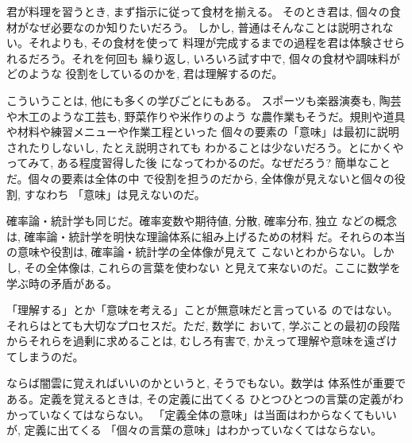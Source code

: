 君が料理を習うとき, まず指示に従って食材を揃える。
そのとき君は, 個々の食材がなぜ必要なのか知りたいだろう。
しかし, 普通はそんなことは説明されない。それよりも, その食材を使って
料理が完成するまでの過程を君は体験させられるだろう。それを何回も
繰り返し, いろいろ試す中で, 個々の食材や調味料がどのような
役割をしているのかを, 君は理解するのだ。\mv

こういうことは, 他にも多くの学びごとにもある。
スポーツも楽器演奏も, 陶芸や木工のような工芸も, 野菜作りや米作りのよう
な農作業もそうだ。規則や道具や材料や練習メニューや作業工程といった
個々の要素の「意味」は最初に説明されたりしないし, たとえ説明されても
わかることは少ないだろう。とにかくやってみて, ある程度習得した後
になってわかるのだ。なぜだろう? 簡単なことだ。個々の要素は全体の中
で役割を担うのだから, 全体像が見えないと個々の役割, すなわち
「意味」は見えないのだ。

確率論・統計学も同じだ。確率変数や期待値, 分散, 確率分布, 独立
などの概念は, 確率論・統計学を明快な理論体系に組み上げるための材料
だ。それらの本当の意味や役割は, 確率論・統計学の全体像が見えて
こないとわからない。しかし, その全体像は, これらの言葉を使わない
と見えて来ないのだ。ここに数学を学ぶ時の矛盾がある。\mv

「理解する」とか「意味を考える」ことが無意味だと言っている
のではない。それらはとても大切なプロセスだ。ただ, 数学に
おいて, 学ぶことの最初の段階からそれらを過剰に求めることは, 
むしろ有害で, かえって理解や意味を遠ざけてしまうのだ。

ならば闇雲に覚えればいいのかというと, そうでもない。数学は
体系性が重要である。定義を覚えるときは, その定義に出てくる
ひとつひとつの言葉の定義がわかっていなくてはならない。
「定義全体の意味」は当面はわからなくてもいいが, 定義に出てくる
「個々の言葉の意味」はわかっていなくてはならない。

